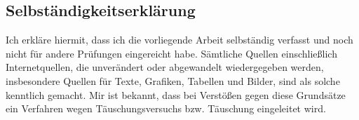 \documentclass[
a4paper,
pagesize,
pdftex,
12pt,
twoside, %
BCOR=5mm, %
ngerman,
fleqn,
final,
]{scrartcl}
\begin{document}
	\cleardoublepage%
	{\parindent0cm
		\subsection*{Selbständigkeitserklärung}
		Ich erkläre hiermit, dass ich die vorliegende Arbeit selbständig verfasst
		und noch nicht für andere Prüfungen eingereicht habe.
		Sämtliche Quellen einschließlich Internetquellen, die unverändert oder
		abgewandelt wiedergegeben werden, insbesondere Quellen für Texte, Grafiken,
		Tabellen und Bilder, sind als solche kenntlich gemacht. Mir ist bekannt,
		dass bei Verstößen gegen diese Grundsätze ein Verfahren wegen
		Täuschungsversuchs bzw. Täuschung eingeleitet wird.
		\vspace{3\baselineskip}
		
	}

	
\end{document}
